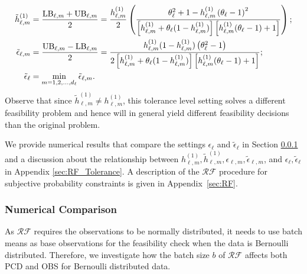 \documentclass[11pt]{article}
\begin{document}
\begin{align}
    \tilde{h}_{\ell,m}^{(1)} &= \frac{{\rm LB}_{\ell, m} + {\rm UB}_{\ell, m}}{2} = \frac{h_{\ell,m}^{(1)}}{2} \left(\frac{\theta_\ell^2+1-h_{\ell,m}^{(1)} \left( \theta_\ell-1 \right)^2}{\left[h_{\ell,m}^{(1)}+\theta_\ell (1-h_{\ell,m}^{(1)})\right]\left[h_{\ell,m}^{(1)} (\theta_\ell-1)+1\right]} \right); \label{eqn:h_tilde} \\ 
    \tilde{\epsilon}_{\ell,m} &= \frac{ {\rm UB}_{\ell,m} - {\rm LB}_{\ell, m} }{2} = \frac{ h_{\ell,m}^{(1)} (1-h_{\ell,m}^{(1)}) \left(\theta_\ell^2-1\right) }{2 \left[h_{\ell,m}^{(1)}+\theta_\ell (1-h_{\ell,m}^{(1)})\right]\left[h_{\ell,m}^{(1)} (\theta_\ell-1)+1\right] }; \label{eqn:epsilon_tilde}  \\
    \tilde{\epsilon}_\ell &= \min_{m=1,2,\ldots,d_\ell} \tilde{\epsilon}_{\ell, m}.  \label{eqn:epsilon}
\end{align}
Observe that since $\tilde{h}_{\ell,m}^{(1)}\not=h_{\ell,m}^{(1)}$, this tolerance level setting solves a different feasibility problem and hence will in general yield different feasibility decisions than the original problem. 

We provide numerical results that compare the settings $\epsilon_\ell$ and $\tilde{\epsilon}_\ell$ in Section \ref{sec:BatchSize_CompareRF} and a discussion about the relationship between $h_{\ell, m}^{(1)}, \tilde{h}_{\ell,m}^{(1)},\epsilon_{\ell, m}, \tilde{\epsilon}_{\ell,m}$, and $\epsilon_\ell,\tilde{\epsilon}_\ell$ in Appendix \ref{sec:RF_Tolerance}.
A description of the $\mathcal{RF}$ procedure for subjective probability constraints is given in Appendix~\ref{sec:RF}.

\subsubsection{Numerical Comparison}
\label{sec:BatchSize_CompareRF}

As $\mathcal{RF}$ requires the observations to be normally distributed, it needs to use batch means as base observations for the feasibility check when the data is Bernoulli distributed. 
Therefore, we investigate how the batch size $b$ of $\mathcal{RF}$ affects both PCD and OBS for Bernoulli distributed data. 
\end{document}
